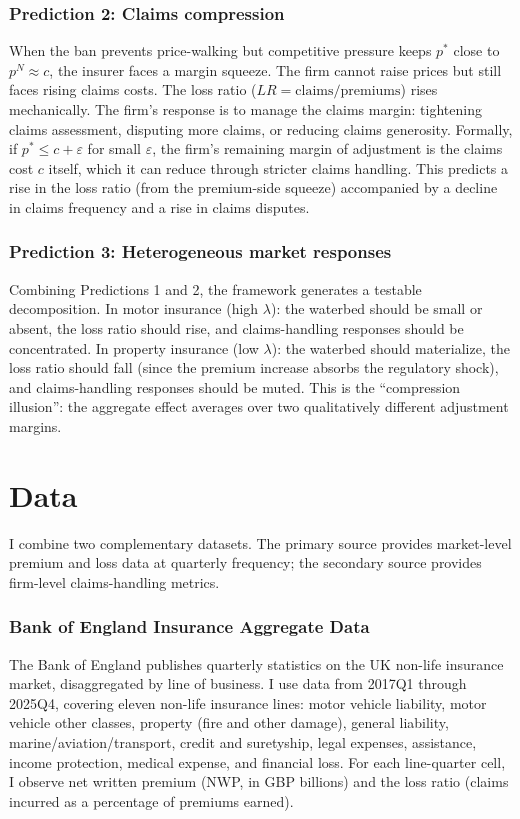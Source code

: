 \documentclass[12pt]{article}
\begin{document}
\subsubsection*{Prediction 2: Claims compression} When the ban prevents price-walking but competitive pressure keeps $p^*$ close to $p^N \approx c$, the insurer faces a margin squeeze. The firm cannot raise prices but still faces rising claims costs. The loss ratio ($LR = \text{claims}/\text{premiums}$) rises mechanically. The firm's response is to manage the claims margin: tightening claims assessment, disputing more claims, or reducing claims generosity. Formally, if $p^* \leq c + \varepsilon$ for small $\varepsilon$, the firm's remaining margin of adjustment is the claims cost $c$ itself, which it can reduce through stricter claims handling. This predicts a rise in the loss ratio (from the premium-side squeeze) accompanied by a decline in claims frequency and a rise in claims disputes.

\subsubsection*{Prediction 3: Heterogeneous market responses} Combining Predictions 1 and 2, the framework generates a testable decomposition. In motor insurance (high $\lambda$): the waterbed should be small or absent, the loss ratio should rise, and claims-handling responses should be concentrated. In property insurance (low $\lambda$): the waterbed should materialize, the loss ratio should fall (since the premium increase absorbs the regulatory shock), and claims-handling responses should be muted. This is the ``compression illusion'': the aggregate effect averages over two qualitatively different adjustment margins.


\section{Data}
\label{sec:data}

I combine two complementary datasets. The primary source provides market-level premium and loss data at quarterly frequency; the secondary source provides firm-level claims-handling metrics.

\subsubsection*{Bank of England Insurance Aggregate Data} The Bank of England publishes quarterly statistics on the UK non-life insurance market, disaggregated by line of business. I use data from 2017Q1 through 2025Q4, covering eleven non-life insurance lines: motor vehicle liability, motor vehicle other classes, property (fire and other damage), general liability, marine/aviation/transport, credit and suretyship, legal expenses, assistance, income protection, medical expense, and financial loss. For each line-quarter cell, I observe net written premium (NWP, in GBP billions) and the loss ratio (claims incurred as a percentage of premiums earned).
\end{document}
